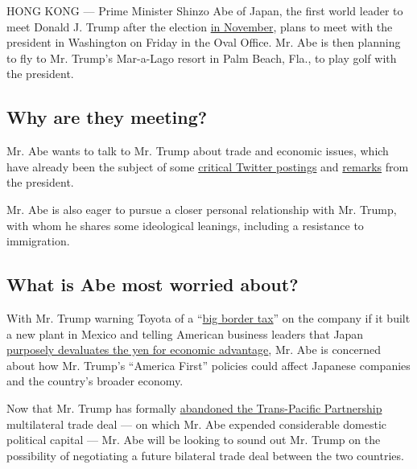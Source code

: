HONG KONG --- Prime Minister Shinzo Abe of Japan, the first world leader
to meet Donald J. Trump after the election
\href{https://www.nytimes.com/2016/11/17/world/asia/shinzo-abe-donald-trump.html}{in
November}, plans to meet with the president in Washington on Friday in
the Oval Office. Mr. Abe is then planning to fly to Mr. Trump's
Mar-a-Lago resort in Palm Beach, Fla., to play golf with the president.

\hypertarget{why-are-they-meeting}{%
\subsection{Why are they meeting?}\label{why-are-they-meeting}}

Mr. Abe wants to talk to Mr. Trump about trade and economic issues,
which have already been the subject of some
\href{https://www.nytimes.com/2017/01/06/business/trump-toyota-mexico-twitter-threat.html}{critical
Twitter postings} and
\href{https://www.nytimes.com/2017/02/02/upshot/should-dollar-rise-or-fall-the-trump-teams-message-is-garbled.html}{remarks}
from the president.

Mr. Abe is also eager to pursue a closer personal relationship with Mr.
Trump, with whom he shares some ideological leanings, including a
resistance to immigration.

\hypertarget{what-is-abe-most-worried-about}{%
\subsection{What is Abe most worried
about?}\label{what-is-abe-most-worried-about}}

With Mr. Trump warning Toyota of a
``\href{https://twitter.com/realDonaldTrump/status/817071792711942145}{big
border tax}'' on the company if it built a new plant in Mexico and
telling American business leaders that Japan
\href{https://www.nytimes.com/aponline/2017/02/01/world/asia/ap-as-japan-us-currency-.html}{purposely
devaluates the yen for economic advantage}, Mr. Abe is concerned about
how Mr. Trump's ``America First'' policies could affect Japanese
companies and the country's broader economy.

Now that Mr. Trump has formally
\href{https://www.nytimes.com/2017/01/23/us/politics/tpp-trump-trade-nafta.html}{abandoned
the Trans-Pacific Partnership} multilateral trade deal --- on which Mr.
Abe expended considerable domestic political capital --- Mr. Abe will be
looking to sound out Mr. Trump on the possibility of negotiating a
future bilateral trade deal between the two countries.

